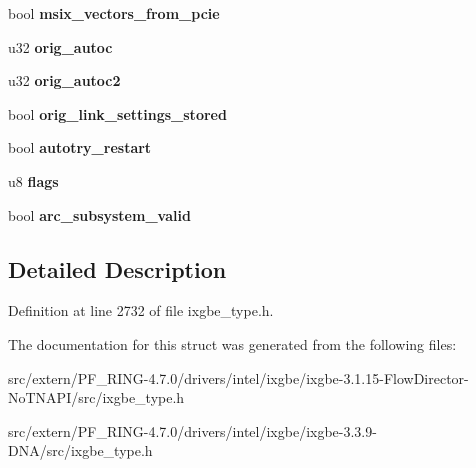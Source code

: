 \begin{DoxyCompactItemize}
\item 
\hypertarget{structixgbe__mac__info_ab33c6263b1455875a52381e6df751a16}{
bool {\bfseries msix\_\-vectors\_\-from\_\-pcie}}
\label{structixgbe__mac__info_ab33c6263b1455875a52381e6df751a16}

\item 
\hypertarget{structixgbe__mac__info_aec255f6144d4f0f76c170f9de79ea9ad}{
u32 {\bfseries orig\_\-autoc}}
\label{structixgbe__mac__info_aec255f6144d4f0f76c170f9de79ea9ad}

\item 
\hypertarget{structixgbe__mac__info_a08bc6e9bd3e964c3324d25fd9c03f22e}{
u32 {\bfseries orig\_\-autoc2}}
\label{structixgbe__mac__info_a08bc6e9bd3e964c3324d25fd9c03f22e}

\item 
\hypertarget{structixgbe__mac__info_a11e5b44f2831651527fe0c372d07d138}{
bool {\bfseries orig\_\-link\_\-settings\_\-stored}}
\label{structixgbe__mac__info_a11e5b44f2831651527fe0c372d07d138}

\item 
\hypertarget{structixgbe__mac__info_a19e2c916b8ddf7cbdb5178e30f2c5ecc}{
bool {\bfseries autotry\_\-restart}}
\label{structixgbe__mac__info_a19e2c916b8ddf7cbdb5178e30f2c5ecc}

\item 
\hypertarget{structixgbe__mac__info_a9aeab0355cb4c32286bd1295356b8cbb}{
u8 {\bfseries flags}}
\label{structixgbe__mac__info_a9aeab0355cb4c32286bd1295356b8cbb}

\item 
\hypertarget{structixgbe__mac__info_af7ec90f03b4bc9b6a3e001fef68b2811}{
bool {\bfseries arc\_\-subsystem\_\-valid}}
\label{structixgbe__mac__info_af7ec90f03b4bc9b6a3e001fef68b2811}

\end{DoxyCompactItemize}


\subsection{Detailed Description}


Definition at line 2732 of file ixgbe\_\-type.h.



The documentation for this struct was generated from the following files:\begin{DoxyCompactItemize}
\item 
src/extern/PF\_\-RING-\/4.7.0/drivers/intel/ixgbe/ixgbe-\/3.1.15-\/FlowDirector-\/NoTNAPI/src/ixgbe\_\-type.h\item 
src/extern/PF\_\-RING-\/4.7.0/drivers/intel/ixgbe/ixgbe-\/3.3.9-\/DNA/src/ixgbe\_\-type.h\end{DoxyCompactItemize}
